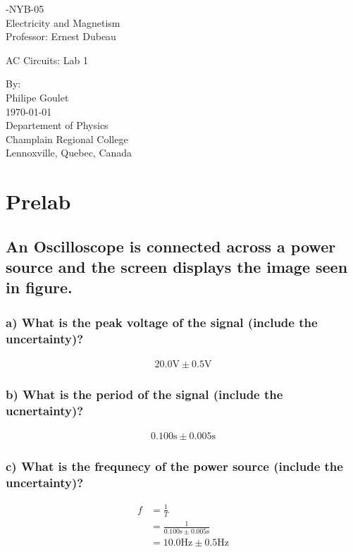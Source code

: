 \documentclass{report}
\begin{document}
\begin{titlepage}
    -NYB-05\\
    Electricity and Magnetism\\
    Professor: Ernest Dubeau\par
    \vspace{5cm}
    \Large AC Circuits: Lab 1\par
    \normalsize
    By:\\
    Philipe Goulet\\
    \vspace*{\fill}
    {\today}\\
    Departement of Physics\\
    Champlain Regional College\\
    Lennoxville, Quebec, Canada
\end{titlepage}
\chapter{Prelab}

\section{An Oscilloscope is connected across a power source and the screen displays the image seen in figure. }

\subsection*{a) What is the peak voltage of the signal (include the uncertainty)?}
    \begin{gather}
        20.0\si{\volt}\pm0.5\si{\volt}
    \end{gather}

\subsection*{b) What is the period of the signal (include the ucnertainty)?}
    \begin{gather}
        0.100\si{\second}\pm0.005\si{\second}
    \end{gather}

\subsection*{c) What is the frequnecy of the power source (include the uncertainty)?}
    \begin{align}
        f&=\frac{1}{T}\nonumber\\
         &=\frac{1}{0.100\si{\second}\pm0.005\si{\second}}\nonumber\\
         &=10.0\si{\hertz}\pm0.5\si{\hertz}
    \end{align}
\end{document}
